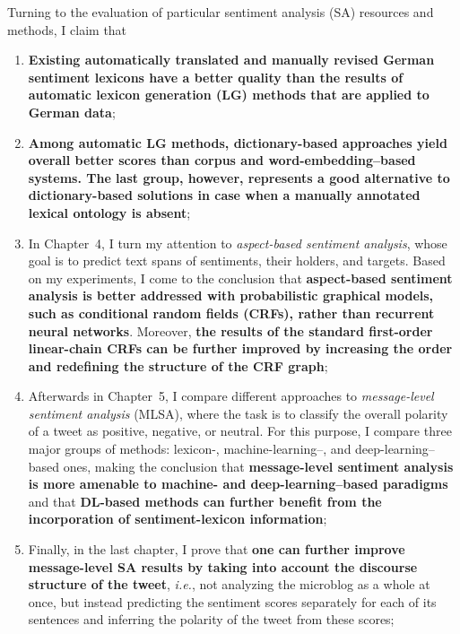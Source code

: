 \documentclass[11pt]{article}
\newcommand{\ienocomma}{\textit{i.e.}}
\newcommand{\ie}{\ienocomma,}
\begin{document}
Turning to the evaluation of particular sentiment analysis (SA)
resources and methods, I claim that
\begin{enumerate}
\item\textbf{Existing automatically translated and manually revised
  German sentiment lexicons have a better quality than the results of
  automatic lexicon generation (LG) methods that are applied to German
  data};

\item\textbf{Among automatic LG methods, dictionary-based approaches
  yield overall better scores than corpus and word-embedding--based
  systems.  The last group, however, represents a good alternative to
  dictionary-based solutions in case when a manually annotated lexical
  ontology is absent};

\item In Chapter~4, I turn my attention to \emph{aspect-based
  sentiment analysis}, whose goal is to predict text spans of
  sentiments, their holders, and targets.  Based on my experiments, I
  come to the conclusion that \textbf{aspect-based sentiment analysis
    is better addressed with probabilistic graphical models, such as
    conditional random fields (CRFs), rather than recurrent neural
    networks}.  Moreover, \textbf{the results of the standard
    first-order linear-chain CRFs can be further improved by
    increasing the order and redefining the structure of the CRF
    graph};

\item Afterwards in Chapter~5, I compare different approaches to
  \emph{message-level sentiment analysis} (MLSA), where the task is to
  classify the overall polarity of a tweet as positive, negative, or
  neutral.  For this purpose, I compare three major groups of methods:
  lexicon-, machine-learning--, and deep-learning--based ones, making
  the conclusion that \textbf{message-level sentiment analysis is more
    amenable to machine- and deep-learning--based paradigms} and that
  \textbf{DL-based methods can further benefit from the incorporation
    of sentiment-lexicon information};

\item Finally, in the last chapter, I prove that \textbf{one can
  further improve message-level SA results by taking into account the
  discourse structure of the tweet}, \ie{} not analyzing the microblog
  as a whole at once, but instead predicting the sentiment scores
  separately for each of its sentences and inferring the polarity of
  the tweet from these scores;
\end{enumerate}
\end{document}
